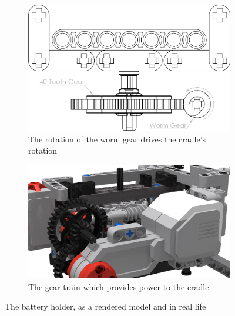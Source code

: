 \documentclass{report}
\begin{document}
	\begin{figure}[H]
		\centering
		\begin{subfigure}[b]{0.37999\textwidth}
			\includegraphics[width=\textwidth]{Resources/Images/dwgCradleWormGear.png}
			\caption{The rotation of the worm gear drives the cradle’s rotation}
			\label{fig:dwgCradleWormGear}
		\end{subfigure}
		\hspace{10mm}
		\begin{subfigure}[b]{0.42014\textwidth}
			\includegraphics[width=\textwidth]{Resources/Images/rdrCradleWormGear.png}
			\caption{The gear train which provides power to the cradle}
			\label{fig:rdrCradleWormGear}
		\end{subfigure}
		\caption{The battery holder, as a rendered model and in real life}
		\label{fig:cradleWormGear}
	\end{figure}
	
\end{document}
